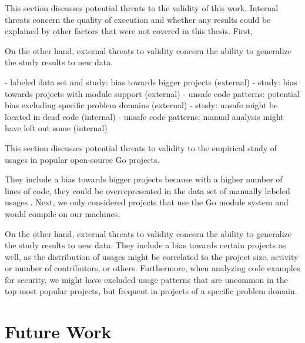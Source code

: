 This section discusses potential threats to the validity of this work.
Internal threats concern the quality of execution and whether any results could be explained by other factors that were
not covered in this thesis.
First,


On the other hand, external threats to validity concern the ability to generalize the study results to new data.


 - labeled data set and study: bias towards bigger projects (external)
 - study: bias towards projects with module support (external)
 - unsafe code patterns: potential bias excluding specific problem domains (external)
 - study: unsafe might be located in dead code (internal)
 - unsafe code patterns: manual analysis might have left out some (internal)


This section discusses potential threats to validity to the empirical study of \unsafe{} usages in popular open-source
Go projects.

They include a bias towards bigger projects because with a higher number of lines of code, they could be
overrepresented in the data set of manually labeled \unsafe{} usages .
Next, we only considered projects that use the Go module system and would compile on our machines.

On the other hand, external threats to validity concern the ability to generalize the study results to new data.
They include a bias towards certain projects as well, as the distribution of \unsafe{} usages might be correlated to the
project size, activity or number of contributors, or others.
Furthermore, when analyzing \unsafe{} code examples for security, we might have excluded usage patterns that are
uncommon in the top \projsTotal{} most popular projects, but frequent in projects of a specific problem domain.



\section{Future Work}\label{sec:discussion:future-work}

